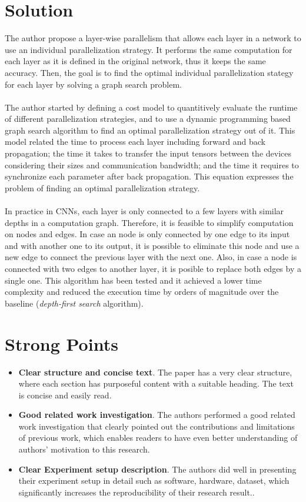 \documentclass[10pt]{proc}
\begin{document}
\section{Solution}
The author propose a layer-wise parallelism that allows each layer in a network to use an individual parallelization strategy. It performs the same computation for each layer as it is defined in the original network, thus it keeps the same accuracy. Then, the goal is to find the optimal individual parallelization stategy for each layer by solving a graph search problem.\\
\\
The author started by defining a cost model to quantitively evaluate the runtime of different parallelization strategies, and to use a dynamic programming based graph search algorithm to find an optimal parallelization strategy out of it. This model related the time to process each layer including forward and back propagation; the time it takes to transfer the input tensors between the devices considering their sizes and communication bandwidth; and the time it requires to synchronize each parameter after back propagation. This equation expresses the problem of finding an optimal parallelization strategy.\\
\\
In practice in CNNs, each layer is only connected to a few layers with similar depths in a computation graph. Therefore, it is feasible to simplify computation on nodes and edges. In case an node is only connected by one edge to its input and with another one to its output, it is possible to eliminate this node and use a new edge to connect the previous layer with the next one. Also, in case a node is connected with two edges to another layer, it is posible to replace both edges by a single one. This algorithm has been tested and it achieved a lower time complexity and reduced the execution time by orders of magnitude over the baseline (\textit{depth-first search} algorithm).

\section{Strong Points}
\begin{itemize}
\item \textbf{Clear structure and concise text}. The paper has a very clear structure, where each section has purposeful content with a suitable heading. The text is concise and easily read.
\item \textbf{Good related work investigation}. The authors performed a good related work investigation that clearly pointed out the contributions and limitations of previous work, which enables readers to have even better understanding of authors' motivation to this research.
\item \textbf{Clear Experiment setup description}. The authors did well in presenting their experiment setup in detail such as software, hardware, dataset, which significantly increases the reproducibility of their research result..
\end{itemize}
\end{document}

